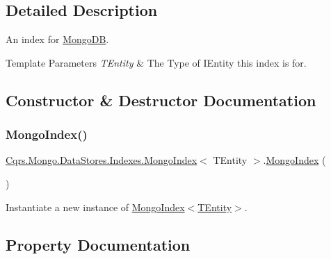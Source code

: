 \subsection{Detailed Description}
An index for \hyperlink{namespaceCqrs_1_1MongoDB}{Mongo\+DB}. 


\begin{DoxyTemplParams}{Template Parameters}
{\em T\+Entity} & The Type of I\+Entity this index is for.\\
\hline
\end{DoxyTemplParams}


\subsection{Constructor \& Destructor Documentation}
\mbox{\label{classCqrs_1_1Mongo_1_1DataStores_1_1Indexes_1_1MongoIndex_a7affbb063520cd8c8bda27f8478efd06_a7affbb063520cd8c8bda27f8478efd06}} 
\subsubsection{\texorpdfstring{Mongo\+Index()}{MongoIndex()}}
{\footnotesize\ttfamily \hyperlink{classCqrs_1_1Mongo_1_1DataStores_1_1Indexes_1_1MongoIndex}{Cqrs.\+Mongo.\+Data\+Stores.\+Indexes.\+Mongo\+Index}$<$ T\+Entity $>$.\hyperlink{classCqrs_1_1Mongo_1_1DataStores_1_1Indexes_1_1MongoIndex}{Mongo\+Index} (\begin{DoxyParamCaption}{ }\end{DoxyParamCaption})\hspace{0.3cm}{\ttfamily [protected]}}



Instantiate a new instance of \hyperlink{classCqrs_1_1Mongo_1_1DataStores_1_1Indexes_1_1MongoIndex_a7affbb063520cd8c8bda27f8478efd06_a7affbb063520cd8c8bda27f8478efd06}{Mongo\+Index$<$\+T\+Entity$>$}. 



\subsection{Property Documentation}
\mbox{\label{classCqrs_1_1Mongo_1_1DataStores_1_1Indexes_1_1MongoIndex_a59cbfafa9c0a32a8f9befddc3fb3956b_a59cbfafa9c0a32a8f9befddc3fb3956b}} 
